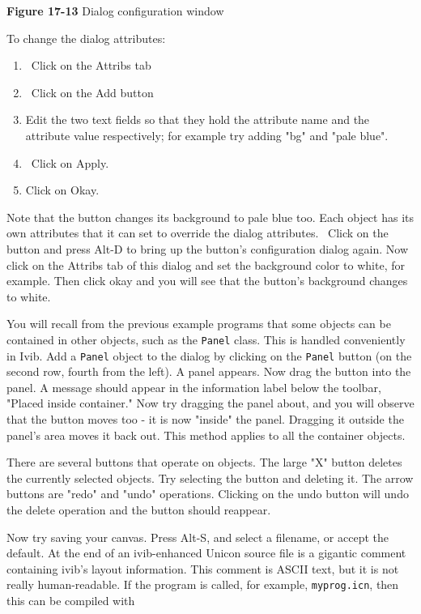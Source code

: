 {\sffamily\bfseries Figure 17-13}
{\sffamily Dialog configuration window}

\bigskip

To change the dialog attributes:

\begin{enumerate}
\item \ Click on the Attribs tab

\item \ Click on the Add button


\item Edit the two text fields so that they hold the attribute name and
the attribute value respectively; for example try adding
"bg" and "pale blue".
\item \ Click on Apply.

\item Click on Okay.
\end{enumerate}

\bigskip

Note that the button changes its background to pale blue too. Each
object has its own attributes that it can set to override the dialog
attributes. \ Click on the button and press Alt-D to bring up the
button's configuration dialog again. Now click on the
Attribs tab of this dialog and set the background color to white, for
example. Then click okay and you will see that the
button's background changes to white.

You will recall from the previous example programs that some objects can
be contained in other objects, such as the \texttt{Panel} class. This
is handled conveniently in Ivib. Add a \texttt{Panel} object to the
dialog by clicking on the \texttt{Panel} button (on the second row,
fourth from the left). A panel appears. Now drag the button into the
panel. A message should appear in the information label below the
toolbar, "Placed inside container." Now try
dragging the panel about, and you will observe that the button moves
too - it is now "inside" the panel.
Dragging it outside the panel's area moves it back
out. This method applies to all the container objects.

There are several buttons that operate on objects. The large
"X" button deletes the currently selected
objects. Try selecting the button and deleting it. The arrow buttons
are "redo" and
"undo" operations. Clicking on the undo
button will undo the delete operation and the button should reappear.

Now try saving your canvas. Press Alt-S, and select a filename, or
accept the default. At the end of an ivib-enhanced Unicon source file
is a gigantic comment containing ivib's layout
information. This comment is ASCII text, but it is not
really human-readable. If the program is called, for example,
\texttt{myprog.icn}, then this can be compiled with

